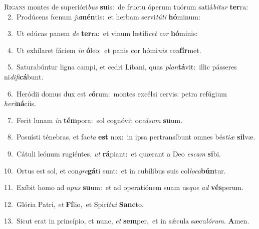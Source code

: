 \lettrine{\initial\textcolor{\initialcolor}{R}}{igans} montes de superióri\textit{bus} \textbf{su}\-is:~\star de fructu óperum tuórum satiá\-\textit{bi}\-\textit{tur} \textbf{ter}\-ra:\\
{\numbfont\textcolor{\numbcolor}{~2.}}~Prodúcens fœnum \textit{ju}\-\textbf{mén}tis:~\star et herbam servi\-\textit{tú}\-\textit{ti} \textbf{hó}\-minum:\par
{\numbfont\textcolor{\numbcolor}{~3.}}~Ut edúcas panem \textit{de} \textbf{ter}\-ra:~\star et vinum lætífi\textit{cet} \textit{cor} \textbf{hó}\-minis:\par
{\numbfont\textcolor{\numbcolor}{~4.}}~Ut exhílaret fáciem \textit{in} \textbf{ó}\-leo:~\star et panis cor hómi\textit{nis} \textit{con}\-\textbf{fír}met.\par
{\numbfont\textcolor{\numbcolor}{~5.}}~Saturabúntur ligna campi, et cedri Líbani, quas \textit{plan}\-\textbf{tá}vit:~\star illic pásseres ni\-\textit{di}\-\textit{fi}\textbf{cá}bunt.\par
{\numbfont\textcolor{\numbcolor}{~6.}}~Heródii domus dux est \textit{e}\-\textbf{ó}rum:~\star montes excélsi cervis: petra refúgium \textit{he}\-\textit{ri}\textbf{ná}ciis.\par
{\numbfont\textcolor{\numbcolor}{~7.}}~Fecit lunam \textit{in} \textbf{tém}\-pora:~\star sol cognóvit oc\-\textit{cá}\-\textit{sum} \textbf{su}\-um.\par
{\numbfont\textcolor{\numbcolor}{~8.}}~Posuísti ténebras, et fac\textit{ta} \textbf{est} nox:~\star in ipsa pertransíbunt omnes bés\-\textit{ti}\-\textit{æ} \textbf{sil}\-væ.\par
{\numbfont\textcolor{\numbcolor}{~9.}}~Cátuli leónum rugiéntes, \textit{ut} \textbf{rá}\-piant:~\star et quærant a Deo \textit{es}\-\textit{cam} \textbf{si}\-bi.\par
{\numbfont\textcolor{\numbcolor}{10.}}~Ortus est sol, et con\-\textit{gre}\-\textbf{gá}ti sunt:~\star et in cubílibus suis col\-\textit{lo}\-\textit{ca}\textbf{bún}tur.\par
{\numbfont\textcolor{\numbcolor}{11.}}~Exíbit homo ad o\textit{pus} \textbf{su}\-um:~\star et ad operatiónem suam us\textit{que} \textit{ad} \textbf{vés}\-perum.\par
{\numbfont\textcolor{\numbcolor}{12.}}~Glória Patri, \textit{et} \textbf{Fí}\-lio,~\star et Spirí\-\textit{tu}\-\textit{i} \textbf{Sanc}\-to.\par
{\numbfont\textcolor{\numbcolor}{13.}}~Sicut erat in princípio, et nunc, \textit{et} \textbf{sem}\-per,~\star et in sǽcula sæcu\-\textit{ló}\-\textit{rum}. \textbf{A}\-men.\par
